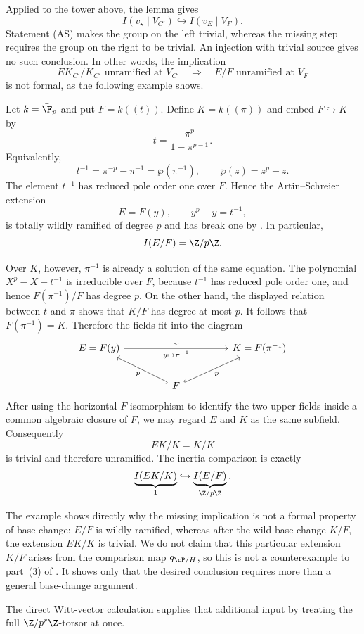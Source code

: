 Applied to the tower above, the lemma gives
\[
I(v_\star\mid V_{C'})\hookrightarrow I(v_E\mid V_F).
\]
Statement (AS) makes the group on the left trivial, whereas the missing step
requires the group on the right to be trivial. An injection with trivial
source gives no such conclusion. In other words, the implication
\[
EK_{C'}/K_{C'}\text{ unramified at }V_{C'}
\quad\Longrightarrow\quad
E/F\text{ unramified at }V_F
\]
is not formal, as the following example shows.

\begin{example}
\label{ex:p2-counterexample}
\label{ex:absorption-explicit}
Let $k=\bar{\F}_p$ and put $F=k((t))$. Define $K=k((\pi))$ and embed
$F\hookrightarrow K$ by
\[
t=\frac{\pi^p}{1-\pi^{p-1}}.
\]
Equivalently,
\[
t^{-1}=\pi^{-p}-\pi^{-1}
       =\wp(\pi^{-1}),
\qquad \wp(z)=z^p-z.
\]
The element $t^{-1}$ has reduced pole order one over $F$. Hence the
Artin--Schreier extension
\[
E=F(y),\qquad y^p-y=t^{-1},
\]
is totally wildly ramified of degree $p$ and has break one by
. In particular,
\[
I(E/F)=\Z/p\Z.
\]

Over $K$, however, $\pi^{-1}$ is already a solution of the same equation.
The polynomial $X^p-X-t^{-1}$ is irreducible over $F$, because $t^{-1}$
has reduced pole order one, and hence $F(\pi^{-1})/F$ has degree $p$.
On the other hand, the displayed relation between $t$ and $\pi$ shows that
$K/F$ has degree at most $p$. It follows that $F(\pi^{-1})=K$. Therefore
the fields fit into the diagram
\[
\begin{tikzcd}[row sep=2.2em, column sep=4.5em]
E=F(y)\ar[rr,"\sim","{y\mapsto\pi^{-1}}"']
  &&K=F(\pi^{-1})\\
  &F\ar[ul,hookrightarrow,"p"]\ar[ur,hookrightarrow,"p"']&
\end{tikzcd}
\]
After using the horizontal $F$-isomorphism to identify the two upper fields
inside a common algebraic closure of $F$, we may regard $E$ and $K$ as the
same subfield. Consequently
\[
EK/K=K/K
\]
is trivial and therefore unramified. The inertia comparison is exactly
\[
\underbrace{I(EK/K)}_{1}
\hookrightarrow
\underbrace{I(E/F)}_{\Z/p\Z}.
\]
\end{example}

The example shows directly why the missing implication is not a formal
property of base change: $E/F$ is wildly ramified, whereas after the wild
base change $K/F$, the extension $EK/K$ is trivial. We do not claim that
this particular extension $K/F$ arises from the comparison map
$q_{\cP/H}$, so this is not a counterexample to part~(3) of
. It shows only that the desired
conclusion requires more than a general base-change argument.
{\color{red}The direct
Witt-vector calculation supplies that additional input by treating the full
$\Z/p^r\Z$-torsor at once.
\par}


